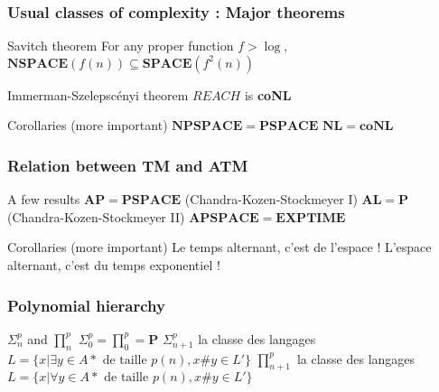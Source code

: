 \documentclass[pdf]{beamer}
\begin{document}
\begin{frame}
\frametitle{Usual classes of complexity : Major theorems}


\begin{alertblock}{Savitch theorem}
For any proper function $f>\log$, $\mathbf{NSPACE}(f(n)) \subseteq \mathbf{SPACE}(f^2(n))$
\end{alertblock}

\begin{alertblock}{Immerman-Szelepscényi theorem}
$REACH$ is \textbf{coNL}
\end{alertblock}

\begin{exampleblock}{Corollaries (more important)}
$\mathbf{NPSPACE} = \mathbf{PSPACE}$\newline
$\mathbf{NL}=\mathbf{coNL}$
\end{exampleblock}


\end{frame}
\begin{frame}
\frametitle{Relation between TM and ATM}

\begin{block}{A few results}
$\mathbf{AP} = \mathbf{PSPACE}$ (Chandra-Kozen-Stockmeyer I) \newline
$\mathbf{AL} = \mathbf{P}$ (Chandra-Kozen-Stockmeyer II) \newline
$\mathbf{APSPACE} = \mathbf{EXPTIME}$ \newline
\end{block}

\begin{exampleblock}{Corollaries (more important)}
Le temps alternant, c'est de l'espace ! \newline
L'espace alternant, c'est du temps exponentiel ! \newline
\end{exampleblock}

\end{frame}

\begin{frame}
\frametitle{Polynomial hierarchy}

\begin{block}{$\Sigma^p_n$ and $\prod^p_n$}
$\Sigma^p_0=\prod^p_0=\mathbf{P}$\newline
$\Sigma^p_{n+1}$ la classe des langages $L=\{x \vert\exists y \in A* \text{ de taille } p(n), x\#y \in L′\}$\newline
$\prod^p_{n+1}$ la classe des langages $L=\{x \vert\forall y \in A* \text{ de taille } p(n), x\#y \in L′\}$\newline
\end{block}

\end{frame}
\end{document}
